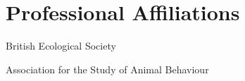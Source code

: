 \documentclass[letterpaper]{article}
\renewenvironment{itemize}{
  \begin{list}{}{
    \setlength{\leftmargin}{1.5em}
  }
}{
  \end{list}
}
\begin{document}
\section*{Professional Affiliations}
\begin{itemize}
\item British Ecological Society
\item Association for the Study of Animal Behaviour
\end{itemize}






\end{document}
